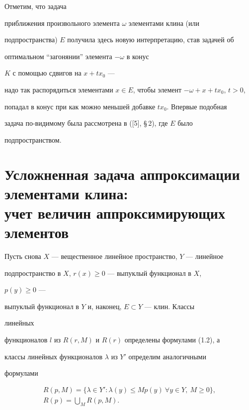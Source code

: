  


Отметим, что задача 


приближения произвольного элемента $\omega$ элементами клина (или 


подпространства) $E$ получила здесь новую интерпретацию, став задачей об 


оптимальном ``загонянии'' элемента $-\omega$ в конус 


$K$ с помощью сдвигов на $x+t x_0$ --- 


надо так распорядиться элементами $x\in E$, чтобы элемент $-\omega+x+t 


x_0$, $t>0$, 


попадал в конус при как можно меньшей добавке $t x_0$. Впервые подобная 


задача по-видимому была рассмотрена в ([5], \S\,2), где $E$ было 


подпространством. 


 


 


\section{Усложненная задача аппроксимации элементами клина: \protect\\ 


учет величин аппроксимирующих элементов} 


 


Пусть снова $X$ --- вещественное линейное пространство, $Y$ --- линейное 


подпространство в $X$, $r(x)\ge0$ --- выпуклый функционал в $X$, 


$p(y)\ge0$ --- 


выпуклый функционал в $Y$ и, наконец, $E\subset Y$ --- клин. Классы 


линейных 


функционалов $l$ из $R(r,M)$ и $R(r)$ определены формулами (1.2), а 


классы линейных функционалов $\lambda$ из $Y'$ определим аналогичными 


формулами 


\begin{equation} 


\begin{array}{c} 


R(p,M)=\{\lambda\in Y':\lambda(y)\le M p(y)\ \forall y\in Y, 


\ M\ge0\}, \\ [2mm]


R(p)=\bigcup\limits_M R(p,M). 


\end{array} 


\end{equation} 


